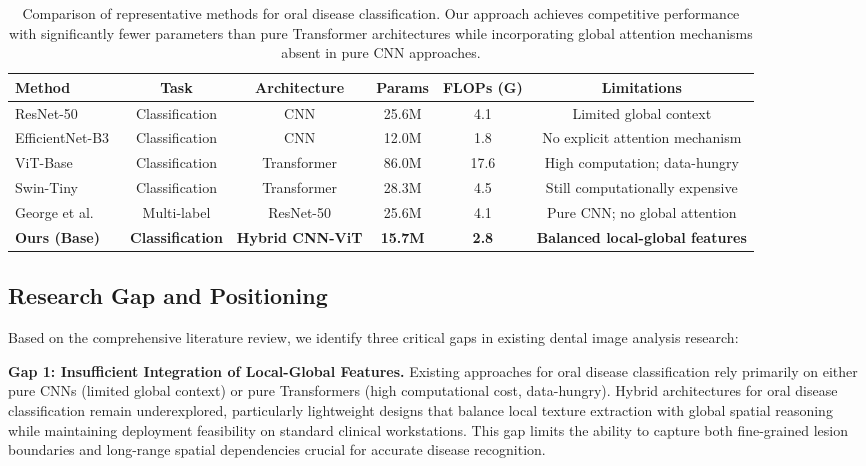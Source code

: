 \begin{table}[t]
\centering
\caption{Comparison of representative methods for oral disease classification. Our approach achieves competitive performance with significantly fewer parameters than pure Transformer architectures while incorporating global attention mechanisms absent in pure CNN approaches.}
\label{tab:comparison}
\begin{tabular}{lccccc}
\hline
\textbf{Method} & \textbf{Task} & \textbf{Architecture} & \textbf{Params} & \textbf{FLOPs (G)} & \textbf{Limitations} \\
\hline
ResNet-50~\cite{he2016deep} & Classification & CNN & 25.6M & 4.1 & Limited global context \\
EfficientNet-B3~\cite{tan2019efficientnet} & Classification & CNN & 12.0M & 1.8 & No explicit attention mechanism \\
ViT-Base~\cite{dosovitskiy2021vit} & Classification & Transformer & 86.0M & 17.6 & High computation; data-hungry \\
Swin-Tiny~\cite{liu2021swin} & Classification & Transformer & 28.3M & 4.5 & Still computationally expensive \\
George et al.~\cite{george2025deep} & Multi-label & ResNet-50 & 25.6M & 4.1 & Pure CNN; no global attention \\
\hline
\textbf{Ours (Base)} & \textbf{Classification} & \textbf{Hybrid CNN-ViT} & \textbf{15.7M} & \textbf{2.8} & \textbf{Balanced local-global features} \\
\hline
\end{tabular}
\end{table}


\subsection{Research Gap and Positioning}
\label{subsec:gap}

Based on the comprehensive literature review, we identify three critical gaps in existing dental image analysis research:

\textbf{Gap 1: Insufficient Integration of Local-Global Features.} Existing approaches for oral disease classification rely primarily on either pure CNNs (limited global context) or pure Transformers (high computational cost, data-hungry). Hybrid architectures for oral disease classification remain underexplored, particularly lightweight designs that balance local texture extraction with global spatial reasoning while maintaining deployment feasibility on standard clinical workstations. This gap limits the ability to capture both fine-grained lesion boundaries and long-range spatial dependencies crucial for accurate disease recognition.

